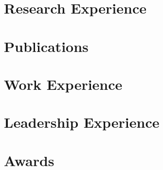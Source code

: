 \documentclass[11pt]{article} %
\begin{document}
\pagebreak[3]
\section{Research Experience}






\pagebreak[3]
\section{Publications}




\pagebreak[3]
\section{Work Experience}










\pagebreak[3]
\section{Leadership Experience}



\pagebreak[3]
\section{Awards}
\end{document}
